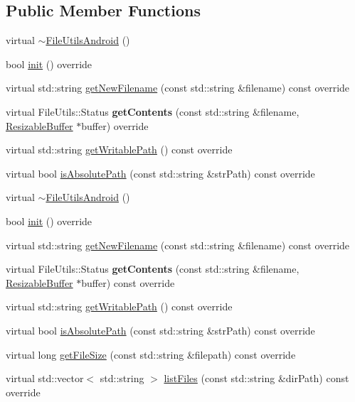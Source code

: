 \subsection*{Public Member Functions}
\begin{DoxyCompactItemize}
\item 
virtual \hyperlink{classFileUtilsAndroid_a32df7a015d4ad6a88a1612e67f17f873}{$\sim$\+File\+Utils\+Android} ()
\item 
bool \hyperlink{classFileUtilsAndroid_a5ff9d802609690baa039ebef0508b2c6}{init} () override
\item 
virtual std\+::string \hyperlink{classFileUtilsAndroid_a57440532823c7b9f5807457fef15b978}{get\+New\+Filename} (const std\+::string \&filename) const override
\item 
\mbox{\label{classFileUtilsAndroid_a0aa95dba279981e1da917e1bcf5d545d}} 
virtual File\+Utils\+::\+Status {\bfseries get\+Contents} (const std\+::string \&filename, \hyperlink{classResizableBuffer}{Resizable\+Buffer} $\ast$buffer) override
\item 
virtual std\+::string \hyperlink{classFileUtilsAndroid_a51cf37a9916441127b8bb349ab037f23}{get\+Writable\+Path} () const override
\item 
virtual bool \hyperlink{classFileUtilsAndroid_aa2d3fbd2b0938439a329a0df42ef0faa}{is\+Absolute\+Path} (const std\+::string \&str\+Path) const override
\item 
virtual \hyperlink{classFileUtilsAndroid_a3b7a34b3412a1fd00b93f8a4b12218d0}{$\sim$\+File\+Utils\+Android} ()
\item 
bool \hyperlink{classFileUtilsAndroid_a5ff9d802609690baa039ebef0508b2c6}{init} () override
\item 
virtual std\+::string \hyperlink{classFileUtilsAndroid_ac084c26eecd3e89ab708ccdab36ec3de}{get\+New\+Filename} (const std\+::string \&filename) const override
\item 
\mbox{\label{classFileUtilsAndroid_af21a1d99a95a9bbdff3f9caf572b0f42}} 
virtual File\+Utils\+::\+Status {\bfseries get\+Contents} (const std\+::string \&filename, \hyperlink{classResizableBuffer}{Resizable\+Buffer} $\ast$buffer) const override
\item 
virtual std\+::string \hyperlink{classFileUtilsAndroid_a98e6cf3fe3d7023fc5adb965c851be85}{get\+Writable\+Path} () const override
\item 
virtual bool \hyperlink{classFileUtilsAndroid_ad13d954ba9ae2de51754965842134652}{is\+Absolute\+Path} (const std\+::string \&str\+Path) const override
\item 
virtual long \hyperlink{classFileUtilsAndroid_a49e69c3f911538576eab8696083cdd39}{get\+File\+Size} (const std\+::string \&filepath) const override
\item 
virtual std\+::vector$<$ std\+::string $>$ \hyperlink{classFileUtilsAndroid_a05bcda7dcc030c83573c7138caebad4c}{list\+Files} (const std\+::string \&dir\+Path) const override
\end{DoxyCompactItemize}
